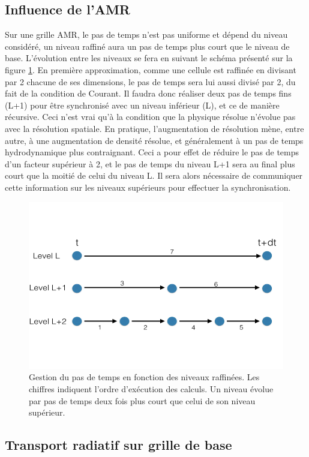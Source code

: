 \subsection{Influence de l'AMR}

Sur une grille \ac{AMR}, le pas de temps n'est pas uniforme et dépend du niveau considéré, un niveau raffiné aura un pas de temps plus court que le niveau de base.
L'évolution entre les niveaux se fera en suivant le schéma présenté sur la figure \ref{fig:timestep}.
En première approximation, comme une cellule est raffinée en divisant par 2 chacune de ses dimensions, le pas de temps sera lui aussi divisé par 2, du fait de la condition de Courant.
Il faudra donc réaliser deux pas de temps fins (L+1) pour être synchronisé avec un niveau inférieur (L), et ce de manière récursive.
Ceci n'est vrai qu'à la condition que la physique résolue n'évolue pas avec la résolution spatiale.
En pratique, l'augmentation de résolution mène, entre autre, à une augmentation de densité résolue, et généralement à un pas de temps hydrodynamique plus contraignant.
Ceci a pour effet de réduire le pas de temps d'un facteur supérieur à 2, et le pas de temps du niveau L+1 sera au final plus court que la moitié de celui du niveau L.
Il sera alors nécessaire de communiquer cette information sur les niveaux supérieurs pour effectuer la synchronisation.

\begin{figure}
\includegraphics[width=.8\linewidth]{img/02/tstep.png}
\caption[Pas de temps AMR]{Gestion du pas de temps en fonction des niveaux raffinées.
Les chiffres indiquent l'ordre d’exécution des calculs.
Un niveau évolue par pas de temps deux fois plus court que celui de son niveau supérieur.
\label{fig:timestep}}
\end{figure}


\subsection{Transport radiatif sur grille de base}
\label{sec:crta}

